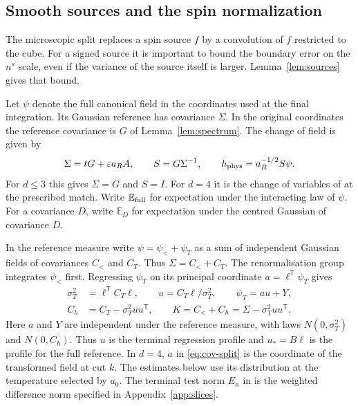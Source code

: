 \documentclass[11pt]{article}
\numberwithin{equation}{section}
\newcommand{\E}{\mathbb E}
\begin{document}
\subsection{Smooth sources and the spin normalization}\label{sec:sources}

The microscopic split replaces a spin source $f$ by a convolution of
$f$ restricted to the cube. For a signed source it is important to
bound the boundary error on the $n^s$ scale, even if the variance of
the source itself is larger. Lemma~\ref{lem:sources} gives that bound.

Let $\psi$ denote the full canonical field in the coordinates used at
the final integration. Its Gaussian reference has covariance $\Sigma$.
In the original coordinates the reference covariance is $G$ of
Lemma~\ref{lem:spectrum}. The change of field is given by
\begin{equation}
 \Sigma=tG+\varepsilon a_R A,\qquad S=G\Sigma^{-1},\qquad
 h_{\rm phys}=a_R^{-1/2}S\psi .
\end{equation}
For $d\le3$ this gives $\Sigma=G$ and $S=I$. For $d=4$ it is the
change of variables of \cite[Lemma~7.10]{base} at the prescribed match.
Write $\E_{\rm full}$ for expectation under the interacting law of
$\psi$. For a covariance $D$, write $\E_D$ for expectation under
the centred Gaussian of covariance $D$.

In the reference measure write $\psi=\psi_<+\psi_T$ as a sum of
independent Gaussian fields of covariances $C_<$ and $C_T$.
Thus $\Sigma=C_<+C_T$. The renormalisation group integrates $\psi_<$ first. Regressing
$\psi_T$ on its principal coordinate $a=\ell^{\mathsf T}\psi_T$ gives
\begin{align}
 \sigma_T^2&=\ell^{\mathsf T}C_T\ell,\qquad
 u=C_T\ell/\sigma_T^2,\qquad \psi_T=au+Y, \\
 C_h&=C_T-\sigma_T^2uu^{\mathsf T},\qquad
 K=C_<+C_h=\Sigma-\sigma_T^2uu^{\mathsf T}. \label{eq:cov-split}
\end{align}
Here $a$ and $Y$ are independent under the reference measure, with
laws $N(0,\sigma_T^2)$ and $N(0,C_h)$. Thus $u$ is the terminal
regression profile and $u_*=B\ell$ is the profile for the full
reference. In $d=4$, $a$ in \eqref{eq:cov-split} is the coordinate
of the transformed field at cut $k$. The estimates below use its
distribution at the temperature selected by $a_0$. The terminal
test norm $E_n$ in \cite[Section~7.1]{base} is the weighted
difference norm specified in Appendix~\ref{app:slices}.
\end{document}
